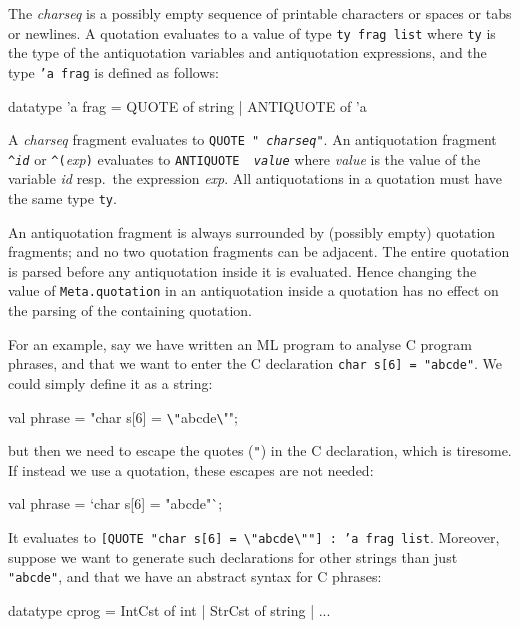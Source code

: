 \documentclass[fleqn]{article}
\begin{document}
\noindent The {\it charseq\/} is a possibly empty sequence of
printable characters or spaces or tabs or newlines.  A quotation
evaluates to a value of type {\tt ty frag list} where {\tt ty} is the
type of the antiquotation variables and antiquotation expressions, and 
the type {\tt 'a frag} is defined as follows:

\begin{program}
datatype 'a frag = QUOTE of string | ANTIQUOTE of 'a
\end{program}

\noindent A {\it charseq\/} fragment evaluates to {\tt QUOTE "{\it
    charseq\/}"}.  An antiquotation fragment {\tt \verb#^#{\it id\/}}
or {\tt \verb#^#(}{\it exp\/}{\tt )} evaluates to {\tt ANTIQUOTE {\it
    value\/}} where {\it value\/} is the value of the variable {\it
  id\/} resp.\ the expression {\it exp\/}.  All antiquotations in a
quotation must have the same type {\tt ty}.

An antiquotation fragment is always surrounded by (possibly empty)
quotation fragments; and no two quotation fragments can be adjacent.
The entire quotation is parsed before any antiquotation inside it is
evaluated.  Hence changing the value of {\tt Meta.quotation} in an
antiquotation inside a quotation has no effect on the parsing of the
containing quotation.

For an example, say we have written an ML program to analyse C program
phrases, and that we want to enter the C declaration {\tt char s[6] =
  "abcde"}.  We could simply define it as a string:

\begin{program}
val phrase = "char s[6] = \verb#\"#abcde\verb#\#"";
\end{program}

\noindent but then we need to escape the quotes ({\tt "}) in the C
declaration, which is tiresome.  If instead we use a quotation, these
escapes are not needed:

\begin{program}
val phrase = `char s[6] = "abcde"`;
\end{program}

\noindent It evaluates to {\tt [QUOTE "char s[6] =
  \verb#\"#abcde\verb#\#""] :\ 'a frag list}.  Moreover, suppose we
want to generate such declarations for other strings than just {\tt
  "abcde"}, and that we have an abstract syntax for C phrases:

\begin{program}
datatype cprog =
    IntCst of int
  | StrCst of string
  | ...  
\end{program}
\end{document}
